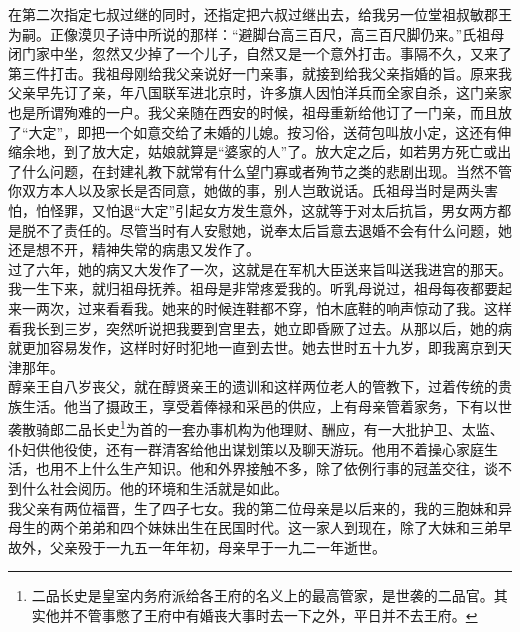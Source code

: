 在第二次指定七叔过继的同时，还指定把六叔过继出去，给我另一位堂祖叔敏郡王为嗣。正像漠贝子诗中所说的那样：“避脚台高三百尺，高三百尺脚仍来。”氏祖母闭门家中坐，忽然又少掉了一个儿子，自然又是一个意外打击。事隔不久，又来了第三件打击。我祖母刚给我父亲说好一门亲事，就接到给我父亲指婚的旨。原来我父亲早先订了亲，年八国联军进北京时，许多旗人因怕洋兵而全家自杀，这门亲家也是所谓殉难的一户。我父亲随在西安的时候，祖母重新给他订了一门亲，而且放了“大定”，即把一个如意交给了未婚的儿媳。按习俗，送荷包叫放小定，这还有伸缩余地，到了放大定，姑娘就算是“婆家的人”了。放大定之后，如若男方死亡或出了什么问题，在封建礼教下就常有什么望门寡或者殉节之类的悲剧出现。当然不管你双方本人以及家长是否同意，她做的事，别人岂敢说话。氏祖母当时是两头害怕，怕怪罪，又怕退“大定”引起女方发生意外，这就等于对太后抗旨，男女两方都是脱不了责任的。尽管当时有人安慰她，说奉太后旨意去退婚不会有什么问题，她还是想不开，精神失常的病患又发作了。\\

过了六年，她的病又大发作了一次，这就是在军机大臣送来旨叫送我进宫的那天。我一生下来，就归祖母抚养。祖母是非常疼爱我的。听乳母说过，祖母每夜都要起来一两次，过来看看我。她来的时候连鞋都不穿，怕木底鞋的响声惊动了我。这样看我长到三岁，突然听说把我要到宫里去，她立即昏厥了过去。从那以后，她的病就更加容易发作，这样时好时犯地一直到去世。她去世时五十九岁，即我离京到天津那年。\\

醇亲王自八岁丧父，就在醇贤亲王的遗训和这样两位老人的管教下，过着传统的贵族生活。他当了摄政王，享受着俸禄和采邑的供应，上有母亲管着家务，下有以世袭散骑郎二品长史\footnote{二品长史是皇室内务府派给各王府的名义上的最高管家，是世袭的二品官。其实他并不管事憋了王府中有婚丧大事时去一下之外，平日并不去王府。}为首的一套办事机构为他理财、酬应，有一大批护卫、太监、仆妇供他役使，还有一群清客给他出谋划策以及聊天游玩。他用不着操心家庭生活，也用不上什么生产知识。他和外界接触不多，除了依例行事的冠盖交往，谈不到什么社会阅历。他的环境和生活就是如此。\\

我父亲有两位福晋，生了四子七女。我的第二位母亲是以后来的，我的三胞妹和异母生的两个弟弟和四个妹妹出生在民国时代。这一家人到现在，除了大妹和三弟早故外，父亲殁于一九五一年年初，母亲早于一九二一年逝世。\\

